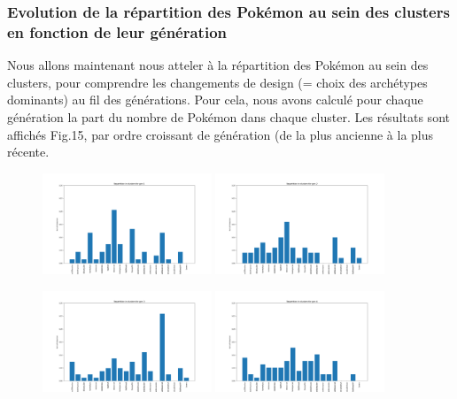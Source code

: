\documentclass[a4paper,12pt]{article}
\begin{document}
\subsubsection{Evolution de la répartition des Pokémon au sein des clusters en fonction de leur génération}

Nous allons maintenant nous atteler à la répartition des Pokémon au sein des
clusters, pour comprendre les changements de design (= choix des archétypes
dominants) au fil des générations. Pour cela, nous avons calculé pour chaque
génération la part du nombre de Pokémon dans chaque cluster. Les résultats sont
affichés Fig.15, par ordre croissant de génération (de la plus ancienne à la
plus récente.

\begin{figure}[!h]
    \centering

    \includegraphics[width=0.45\textwidth]{Clustering/number_poke_gen/gen1.png}
    \includegraphics[width=0.45\textwidth]{Clustering/number_poke_gen/gen2.png}
    

    \vspace{1em}  %

    \includegraphics[width=0.45\textwidth]{Clustering/number_poke_gen/gen3.png}
    \includegraphics[width=0.45\textwidth]{Clustering/number_poke_gen/gen4.png}
    


\end{figure}
\end{document}
